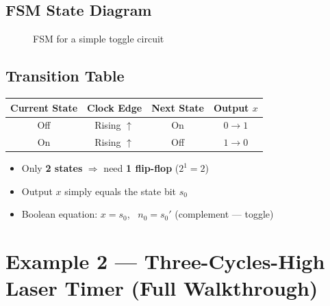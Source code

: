 \documentclass[12pt, a4paper]{article}
\begin{document}
\subsection{FSM State Diagram}

\begin{figure}[H]
\centering
{}
\caption{FSM for a simple toggle circuit}
\end{figure}

\subsection{Transition Table}

\begin{table}[H]
\centering
\renewcommand{\arraystretch}{1.3}
\begin{tabular}{@{} c c c c @{}}
  \toprule
  Current State & Clock Edge & Next State & Output $x$ \\
  \midrule
  Off & Rising $\uparrow$ & On & $0 \to 1$ \\
  On  & Rising $\uparrow$ & Off & $1 \to 0$ \\
  \bottomrule
\end{tabular}
\end{table}

\begin{itemize}
  \item Only \textbf{2 states} $\Rightarrow$ need \textbf{1 flip-flop} ($2^1 = 2$)
  \item Output $x$ simply equals the state bit $s_0$
  \item Boolean equation: $x = s_0$, \ $n_0 = s_0'$ (complement --- toggle)
\end{itemize}

\section{Example 2 --- Three-Cycles-High Laser Timer (Full Walkthrough)}
\end{document}
